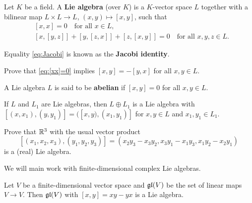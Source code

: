 \chapter{}


\begin{definition}
    Let $K$ be a field. 
    A \textbf{Lie algebra} (over $K$) is a $K$-vector space
    $L$ together with a bilinear map 
    $L\times L\to L$, $(x,y)\mapsto [x,y]$,
    such that
    \begin{align}
        \label{eq:[xx]=0}&[x,x]=0\quad\text{for all $x\in L$},\\ 
        \label{eq:Jacobi}&[x,[y,z]]+[y,[z,x]]+[z,[x,y]]=0\quad\text{for all $x,y,z\in L$}.
    \end{align}
\end{definition}

Equality \eqref{eq:Jacobi} is known as the \textbf{Jacobi identity}. 

\begin{exercise}
    Prove that \eqref{eq:[xx]=0} implies $[x,y]=-[y,x]$ for all
    $x,y\in L$. 
\end{exercise}

A Lie algebra $L$ is said to be \textbf{abelian} if $[x,y]=0$ for 
all $x,y\in L$. 

\begin{exercise}
    If $L$ and $L_1$ are Lie algebras, then 
    $L\oplus L_1$ is a Lie algebra with
    $[(x,x_1),(y,y_1)]=([x,y),(x_1,y_1)]$ for $x,y\in L$ and
    $x_1,y_1\in L_1$. 
\end{exercise}

\begin{exercise}
    Prove that $\mathbb{R}^3$ with the usual vector product 
    \[
    [(x_1,x_2,x_3),(y_1,y_2,y_3)]=(x_2y_3-x_3y_2,x_3y_1-x_1y_3,x_1y_2-x_2y_1)
    \]
    is a (real) Lie algebra.     
\end{exercise}

We will main work with finite-dimensional complex Lie algebras.

\begin{example}
    Let $V$ be a finite-dimensional vector space and 
    $\mathfrak{gl}(V)$ be the set of linear maps $V\to V$. Then 
    $\mathfrak{gl}(V)$ with $[x,y]=xy-yx$ is a Lie algebra. 
\end{example}

